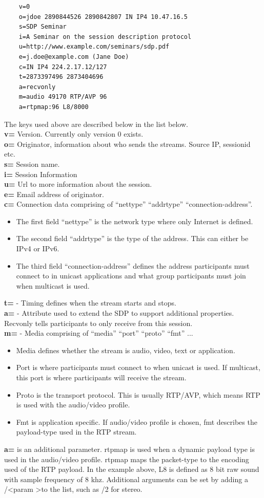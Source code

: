 \begin{verbatim}
    v=0
    o=jdoe 2890844526 2890842807 IN IP4 10.47.16.5
    s=SDP Seminar
    i=A Seminar on the session description protocol
    u=http://www.example.com/seminars/sdp.pdf
    e=j.doe@example.com (Jane Doe)
    c=IN IP4 224.2.17.12/127
    t=2873397496 2873404696
    a=recvonly
    m=audio 49170 RTP/AVP 96
    a=rtpmap:96 L8/8000
\end{verbatim}
The keys used above are described below in the list below. \\
\textbf{v=} Version. Currently only version 0 exists. \\
\textbf{o=} Originator, information about who sends the streams. Source IP, sessionid etc. \\
\textbf{s=} Session name. \\
\textbf{i=} Session Information \\
\textbf{u=} Url to more information about the session.\\
\textbf{e=} Email address of originator.\\
\textbf{c=} Connection data comprising of ``nettype'' ``addrtype'' ``connection-address''.
\begin{itemize}
	\item The first field ``nettype'' is the network type where only Internet is defined. 
	\item The second field ``addrtype'' is the type of the address. This can either be IPv4 or IPv6.
	\item The third field ``connection-address'' defines the address participants must connect to in unicast applications and what group participants must join when multicast is used.
\end{itemize}
\textbf{t=} - Timing defines when the stream starts and stops. \\
\textbf{a=} - Attribute used to extend the SDP to support additional properties. Recvonly tells participants to only receive from this session. \\
\textbf{m=} - Media comprising of ``media'' ``port'' ``proto'' ``fmt'' ...
\begin{itemize}
	\item Media defines whether the stream is audio, video, text or application.
	\item Port is where participants must connect to when unicast is used. If multicast, this port is where participants will receive the stream.
	\item Proto is the transport protocol. This is usually RTP/AVP, which means RTP is used with the audio/video profile.
	\item Fmt is application specific. If audio/video profile is chosen, fmt describes the payload-type used in the RTP stream.
\end{itemize}
\textbf{a=} is an additional parameter. rtpmap is used when a dynamic payload type is used in the audio/video profile. rtpmap maps the packet-type to the encoding used of the RTP payload. In the example above, L8 is defined as 8 bit raw sound with sample frequency of 8 khz. Additional arguments can be set by adding a /\textless param \textgreater to the list, such as /2 for stereo.


